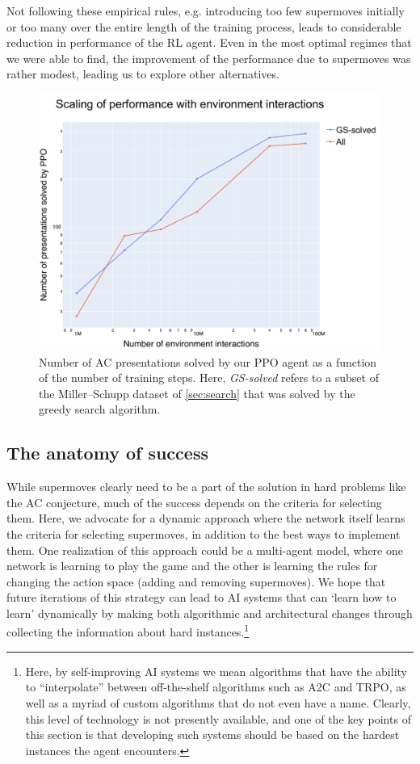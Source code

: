 \noindent
Not following these empirical rules, e.g. introducing too few supermoves initially or too many over the entire length of the training process, leads to considerable reduction in performance of the RL agent. Even in the most optimal regimes that we were able to find, the improvement of the performance due to supermoves was rather modest, leading us to explore other alternatives.

\begin{figure}
	\centering
	\includegraphics[scale=0.35]{fig/scaling_env.pdf}
	\caption{Number of AC presentations solved by our PPO agent as a function of the number of training steps. Here, \textit{GS-solved} refers to a subset of the Miller--Schupp dataset of \autoref{sec:search} that was solved by the greedy search algorithm.}
	\label{fig:scaling_env}
\end{figure}

\subsection{The anatomy of success}

While supermoves clearly need to be a part of the solution in hard problems like the AC conjecture, much of the success depends on the criteria for selecting them. Here, we advocate for a dynamic approach where the network itself learns the criteria for selecting supermoves, in addition to the best ways to implement them. One realization of this approach could be a multi-agent model, where one network is learning to play the game and the other is learning the rules for changing the action space (adding and removing supermoves). We hope that future iterations of this strategy can lead to AI systems that can `learn how to learn' dynamically by making both algorithmic and architectural changes through collecting the information about hard instances.\footnote{Here, by self-improving AI systems we mean algorithms that have the ability to ``interpolate'' between off-the-shelf algorithms such as A2C and TRPO, as well as a myriad of custom algorithms that do not even have a name. Clearly, this level of technology is not presently available, and one of the key points of this section is that developing such systems should be based on the hardest instances the agent encounters.}


